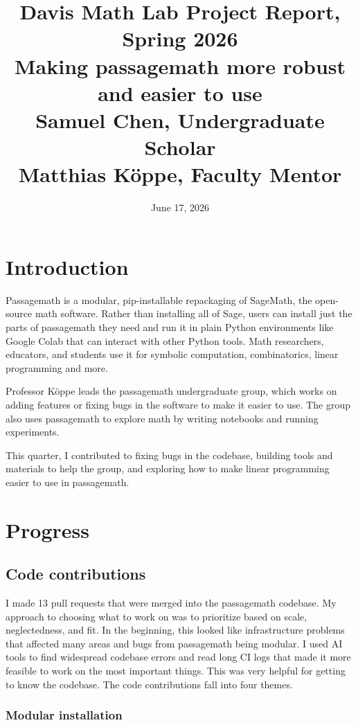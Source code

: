 \documentclass[10pt]{article}
\title{Davis Math Lab Project Report, Spring 2026\\
Making passagemath more robust and easier to use\\
Samuel Chen, Undergraduate Scholar\\
Matthias Köppe, Faculty Mentor}
\author{}
\date{June 17, 2026}
\begin{document}
\maketitle
\tableofcontents

\section{Introduction}

Passagemath is a modular, pip-installable repackaging of SageMath, the open-source math software. Rather than installing all of Sage, users can install just the parts of passagemath they need and run it in plain Python environments like Google Colab that can interact with other Python tools. Math researchers, educators, and students use it for symbolic computation, combinatorics, linear programming and more.

Professor Köppe leads the passagemath undergraduate group, which works on adding features or fixing bugs in the software to make it easier to use. The group also uses passagemath to explore math by writing notebooks and running experiments.

This quarter, I contributed to fixing bugs in the codebase, building tools and materials to help the group, and exploring how to make linear programming easier to use in passagemath.

\section{Progress}

\subsection{Code contributions}

I made 13 pull requests that were merged into the passagemath codebase. My approach to choosing what to work on was to prioritize based on scale, neglectedness, and fit. In the beginning, this looked like infrastructure problems that affected many areas and bugs from passagemath being modular. I used AI tools to find widespread codebase errors and read long CI logs that made it more feasible to work on the most important things. This was very helpful for getting to know the codebase. The code contributions fall into four themes.

\subsubsection{Modular installation}
\end{document}
